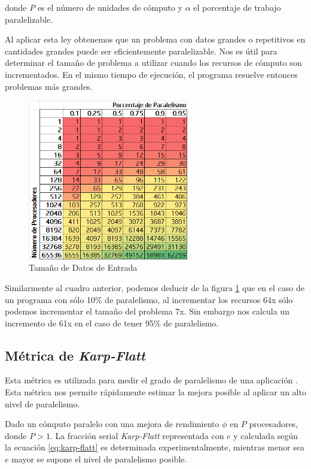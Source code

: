 \documentclass[a4paper]{report}
\begin{document}
donde $ P $ es el número de unidades de cómputo y $ \alpha $ el porcentaje de trabajo paralelizable.

\bigskip

Al aplicar esta ley obtenemos que un problema con datos grandes o repetitivos en cantidades grandes puede ser
eficientemente paralelizable. Nos es útil para determinar el tamaño de problema a utilizar cuando los recursos de cómputo son incrementados.
En el mismo tiempo de ejecución, el programa resuelve entonces problemas más grandes.

\begin{figure}[H]
\begin{center}
\includegraphics[width=7cm]{gustafson.png}
\caption{Tamaño de Datos de Entrada}
\label{fig:gustafson}
\end{center}
\end{figure}

Similarmente al cuadro anterior, podemos deducir de la figura \ref{fig:gustafson} que en el caso de un programa con sólo 10\% de paralelismo,
al incrementar los recursos 64x sólo podemos incrementar el tamaño del problema 7x. Sin embargo nos calcula
un incremento de 61x en el caso de tener 95\% de paralelismo.

\subsection{Métrica de {\it Karp-Flatt}}

Esta métrica es utilizada para medir el grado de paralelismo de una aplicación \cite{karp-flatt}.
Esta métrica nos permite rápidamente estimar la mejora posible al aplicar un alto nivel de paralelismo.

\bigskip

Dado un cómputo paralelo con una mejora de rendimiento $ \phi $ en $ P $
procesadores, donde $ P > 1 $. La fracción serial {\it Karp-Flatt}
representada con $ e $ y calculada según la ecuación \ref{eq:karp-flatt}
es determinada experimentalmente, mientras menor sea $ e $
mayor se supone el nivel de paralelismo posible.
\end{document}
